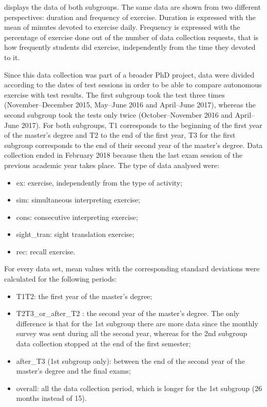 \documentclass[output=paper]{../langscibook}
\begin{document}
 displays the data of both subgroups. The same data are shown from two different perspectives: duration and frequency of exercise. Duration is expressed with the mean of minutes devoted to exercise daily. Frequency is expressed with the percentage of exercise done out of the number of data collection requests, that is how frequently students did exercise, independently from the time they devoted to it.

Since this data collection was part of a broader PhD project, data were divided according to the dates of test sessions in order to be able to compare autonomous exercise with test results. The first subgroup took the test three times (November--December 2015, May--June 2016 and April--June 2017), whereas the second subgroup took the tests only twice (October--November 2016 and April--June 2017). For both subgroups, T1 corresponds to the beginning of the first year of the master’s degree and T2 to the end of the first year, T3 for the first subgroup corresponds to the end of their second year of the master’s degree. Data collection ended in February 2018 because then the last exam session of the previous academic year takes place. The type of data analysed were:


\begin{itemize}

\item ex: exercise, independently from the type of activity;
\item sim: simultaneous interpreting exercise;
\item cons: consecutive interpreting exercise;
\item sight\_tran: sight translation exercise;
\item rec: recall exercise.
\end{itemize}


For every data set, mean values with the corresponding standard deviations were calculated for the following periods:

\begin{itemize}
\item T1T2: the first year of the master’s degree;
\item T2T3\_or\_after\_T2 : the second year of the master’s degree. The only difference is that for the 1st subgroup there are more data since the monthly survey was sent during all the second year, whereas for the 2nd subgroup data collection stopped at the end of the first semester;
\item after\_T3 (1st subgroup only): between the end of the second year of the master’s degree and the final exams;
\item overall: all the data collection period, which is longer for the 1st subgroup (26 months instead of 15).
\end{itemize}
\end{document}

